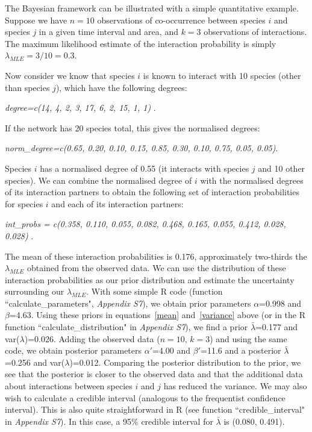 \documentclass[12pt]{article}
\begin{document}
      The Bayesian framework can be illustrated with a simple quantitative example. Suppose we have $n = 10$ observations of co-occurrence between species $i$ and species $j$ in a given time interval and area, and $k = 3$ observations of interactions. The maximum likelihood estimate of the interaction probability is simply $\lambda_{MLE} = 3/10 = 0.3$. 
      

      Now consider we know that species $i$ is known to interact with 10 species (other than species $j$), which have the following degrees:

        \vspace{12pt}
        \noindent\emph{
          degree=c(14, 4, 2, 3, 17, 6, 2, 15, 1, 1)
            }.
          \vspace{12pt}

        If the network has 20 species total, this gives the normalised degrees:

        \vspace{12pt}
        \noindent\emph{
          norm\_degree=c(0.65, 0.20, 0.10, 0.15, 0.85, 0.30, 0.10, 0.75, 0.05, 0.05)}.
          \vspace{12pt}

        Species $i$ has a normalised degree of 0.55 (it interacts with species $j$ and 10 other species). We can combine the normalised degree of $i$ with the normalised degrees of its interaction partners to obtain the following set of interaction probabilities for species $i$ and each of its interaction partners:

        \vspace{12pt}
        \noindent\emph{
           int\_probs = c(0.358, 0.110, 0.055, 0.082, 0.468, 0.165, 0.055, 0.412, 0.028, 0.028) }.
          \vspace{12pt}

        The mean of these interaction probabilities is 0.176, approximately two-thirds the $\lambda_{MLE}$ obtained from the observed data. We can use the distribution of these interaction probabilities as our prior distribution and estimate the uncertainty surrounding our $\lambda_{MLE}$. With some simple R code (function ``calculate\_parameters", \emph{Appendix S7}), we obtain prior parameters $\alpha$=0.998 and $\beta$=4.63. Using these priors in equations~\ref{mean} and~\ref{variance} above (or in the R function ``calculate\_distribution" in \emph{Appendix S7}), we find a prior $\bar\lambda$=0.177 and var($\lambda$)=0.026. Adding the observed data ($n=10$, $k=3$) and using the same code, we obtain posterior parameters $\alpha'$=4.00 and $\beta'$=11.6 and a posterior $\bar\lambda$=0.256 and var($\lambda$)=0.012. Comparing the posterior distribution to the prior, we see that the posterior is closer to the observed data and that the additional data about interactions between species $i$ and $j$ has reduced the variance. We may also wish to calculate a credible interval (analogous to the frequentist confidence interval). This is also quite straightforward in R (see function ``credible\_interval" in \emph{Appendix S7}). In this case, a 95\% credible interval for $\bar\lambda$ is (0.080, 0.491).
\end{document}
